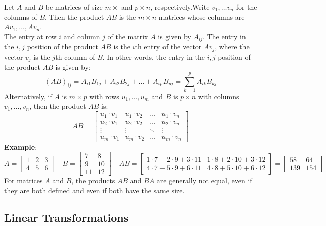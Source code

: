 \documentclass[a4paper, 9pt]{extarticle}
\begin{document}
Let $A$ and $B$ be matrices of size $m \times $ and $p \times n$, respectively.Write $v_1, \ldots v_n$ for the columns of $B$. Then the product $AB$ is the $m \times n$ matrices whose columns are $Av_1 , \ldots, Av_n$. \\[2ex]
The entry at row $i$ and column $j$ of the matrix $A$ is given by $A_{ij}$. The entry in the $i,j$ position of the product $AB$ is the $i$th entry of the vector $Av_j$, where the vector $v_j$ is the $j$th column of $B$. In other words, the entry in the $i,j$ position of the product $AB$ is given by:
$$
  (AB)_{ij} = A_{i1}B_{1j} + A_{i2}B_{2j} + \ldots + A_{ip}B_{pj} = \sum_{k=1}^p A_{ik}B_{kj}
$$
Alternatively, if $A$ is $m \times p$ with rows $u_1, \ldots, u_m$ and $B$ is $p \times n$ with columns $v_1, \ldots, v_n$, then the product $AB$ is:
$$AB =
  \begin{bmatrix}
    u_1 \cdot v_1 & u_1 \cdot v_2 & \ldots & u_1 \cdot v_n \\
    u_2 \cdot v_1 & u_2 \cdot v_2 & \ldots & u_2 \cdot v_n \\
    \vdots        & \vdots        & \ddots & \vdots        \\
    u_m \cdot v_1 & u_m \cdot v_2 & \ldots & u_m \cdot v_n
  \end{bmatrix}
$$
\textbf{Example}:
$$
  A =
  \begin{bmatrix}
    1 & 2 & 3 \\
    4 & 5 & 6
  \end{bmatrix}
  \quad
  B =
  \begin{bmatrix}
    7  & 8  \\
    9  & 10 \\
    11 & 12
  \end{bmatrix}
  \quad
  AB =
  \begin{bmatrix}
    1 \cdot 7 + 2 \cdot 9 + 3 \cdot 11 & 1 \cdot 8 + 2 \cdot 10 + 3 \cdot 12 \\
    4 \cdot 7 + 5 \cdot 9 + 6 \cdot 11 & 4 \cdot 8 + 5 \cdot 10 + 6 \cdot 12
  \end{bmatrix}
  =
  \begin{bmatrix}
    58  & 64  \\
    139 & 154
  \end{bmatrix}
$$
For matrices $A$ and $B$, the products $AB$ and $BA$ are generally not
equal, even if they are both defined and even if both have the same
size.
\subsection*{Linear Transformations}
\end{document}
